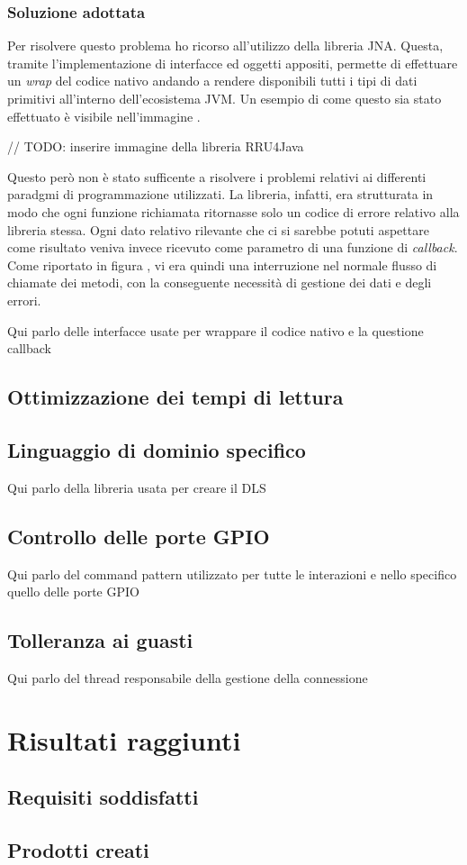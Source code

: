 \subsubsection*{Soluzione adottata}
Per risolvere questo problema ho ricorso all'utilizzo della libreria JNA. Questa, tramite l'implementazione di interfacce ed oggetti appositi, 
permette di effettuare un \emph{wrap} del codice nativo andando a rendere disponibili tutti i tipi di dati primitivi all'interno 
dell'ecosistema JVM. Un esempio di come questo sia stato effettuato è visibile nell'immagine .

// TODO: inserire immagine della libreria RRU4Java

Questo però non è stato sufficente a risolvere i problemi relativi ai differenti paradgmi di programmazione utilizzati. La libreria, infatti, era strutturata
in modo che ogni funzione richiamata ritornasse solo un codice di errore relativo alla libreria stessa. Ogni dato relativo rilevante che ci si sarebbe potuti
aspettare come risultato veniva invece ricevuto come parametro di una funzione di \emph{callback}. Come riportato in figura , vi era quindi una interruzione
nel normale flusso di chiamate dei metodi, con la conseguente necessità di gestione dei dati e degli errori. 


Qui parlo delle interfacce usate per wrappare il codice nativo e la questione callback
\subsection{Ottimizzazione dei tempi di lettura}
\subsection{Linguaggio di dominio specifico}
\label{sub-sec:DLS}
Qui parlo della libreria usata per creare il DLS
\subsection{Controllo delle porte GPIO}
\label{sub-sec:GPIO}
Qui parlo del command pattern utilizzato per tutte le interazioni e nello specifico quello delle porte GPIO
\subsection{Tolleranza ai guasti}
Qui parlo del thread responsabile della gestione della connessione


\section{Risultati raggiunti}
\subsection{Requisiti soddisfatti}
\subsection{Prodotti creati}